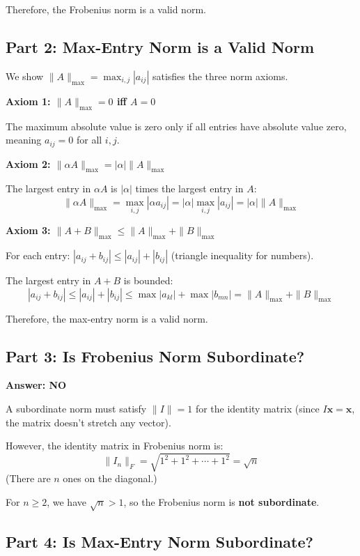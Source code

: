 Therefore, the Frobenius norm is a valid norm. 

\subsection*{Part 2: Max-Entry Norm is a Valid Norm}

We show $\|A\|_{\max} = \max_{i,j} |a_{ij}|$ satisfies the three norm axioms.

\textbf{Axiom 1: $\|A\|_{\max} = 0$ iff $A = 0$}

The maximum absolute value is zero only if all entries have absolute value zero, meaning $a_{ij} = 0$ for all $i,j$.

\textbf{Axiom 2: $\|\alpha A\|_{\max} = |\alpha| \|A\|_{\max}$}

The largest entry in $\alpha A$ is $|\alpha|$ times the largest entry in $A$:
$$\|\alpha A\|_{\max} = \max_{i,j} |\alpha a_{ij}| = |\alpha| \max_{i,j} |a_{ij}| = |\alpha| \|A\|_{\max}$$

\textbf{Axiom 3: $\|A + B\|_{\max} \leq \|A\|_{\max} + \|B\|_{\max}$}

For each entry: $|a_{ij} + b_{ij}| \leq |a_{ij}| + |b_{ij}|$ (triangle inequality for numbers).

The largest entry in $A+B$ is bounded:
$$|a_{ij} + b_{ij}| \leq |a_{ij}| + |b_{ij}| \leq \max |a_{kl}| + \max |b_{mn}| = \|A\|_{\max} + \|B\|_{\max}$$

Therefore, the max-entry norm is a valid norm. 

\subsection*{Part 3: Is Frobenius Norm Subordinate?}

\textbf{Answer: NO}

A subordinate norm must satisfy $\|I\| = 1$ for the identity matrix (since $I\mathbf{x} = \mathbf{x}$, the matrix doesn't stretch any vector).

However, the identity matrix in Frobenius norm is:
$$\|I_n\|_F = \sqrt{1^2 + 1^2 + \cdots + 1^2} = \sqrt{n}$$
(There are $n$ ones on the diagonal.)

For $n \geq 2$, we have $\sqrt{n} > 1$, so the Frobenius norm is \textbf{not subordinate}. 

\subsection*{Part 4: Is Max-Entry Norm Subordinate?}

